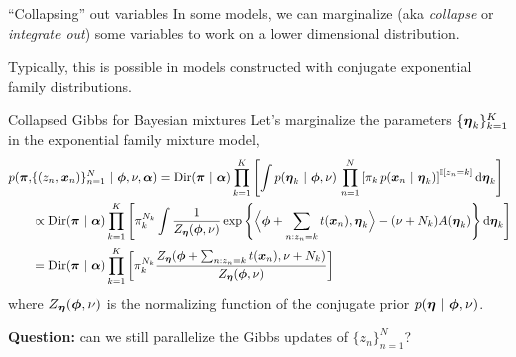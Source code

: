 \documentclass[aspectratio=169]{beamer}
\begin{document}
\begin{frame}{``Collapsing'' out variables}
In some models, we can marginalize (aka \textit{collapse} or \textit{integrate out}) some variables to work on a lower dimensional distribution. 

Typically, this is possible in models constructed with conjugate exponential family distributions.
    
\end{frame}

\begin{frame}{Collapsed Gibbs for Bayesian mixtures}
    Let's marginalize the parameters $\{\boldsymbol{\eta}_k\}_{k=1}^K$ in the exponential family mixture model,
    \begin{align}
        p(\boldsymbol{\pi}, &\{(z_n, \boldsymbol{x}_n)\}_{n=1}^N ~\vert~ \boldsymbol{\phi}, \nu, \boldsymbol{\alpha}) 
        =
        \mathrm{Dir}(\boldsymbol{\pi} ~\vert~ \boldsymbol{\alpha}) \prod_{k=1}^K \left[ \int p(\boldsymbol{\eta}_k ~\vert~ \boldsymbol{\phi}, \nu) \, \prod_{n=1}^N \left[ \pi_k \, p(\boldsymbol{x}_n ~\vert~ \boldsymbol{\eta}_k) \right]^{\mathbb{I}[z_n = k]} \mathop{}\!\mathrm{d} \boldsymbol{\eta}_k \right] \\
        &\propto
        \mathrm{Dir}(\boldsymbol{\pi} ~\vert~ \boldsymbol{\alpha}) \prod_{k=1}^K \left[ \pi_k^{N_k} \int \frac{1}{Z_{\boldsymbol{\eta}}(\boldsymbol{\phi}, \nu)} \exp \left\{\Big\langle \boldsymbol{\phi} + \sum_{n: z_n=k} t(\boldsymbol{x}_n), \boldsymbol{\eta}_k \Big\rangle - (\nu + N_k) A(\boldsymbol{\eta}_k) \right\}  \mathop{}\!\mathrm{d} \boldsymbol{\eta}_k \right] \\
        &=
        \mathrm{Dir}(\boldsymbol{\pi} ~\vert~ \boldsymbol{\alpha}) \prod_{k=1}^K \left[ \pi_k^{N_k} \frac{Z_{\boldsymbol{\eta}}(\boldsymbol{\phi} + \sum_{n: z_n=k} t(\boldsymbol{x}_n), \nu + N_k)}{Z_{\boldsymbol{\eta}}(\boldsymbol{\phi}, \nu)} \right]
    \end{align}
    where $Z_{\boldsymbol{\eta}}(\boldsymbol{\phi}, \nu)$ is the normalizing function of the conjugate prior $p(\boldsymbol{\eta} ~\vert~ \boldsymbol{\phi}, \nu)$.
    
    \textbf{Question: } can we still parallelize the Gibbs updates of $\{z_n\}_{n=1}^N$?
\end{frame}
\end{document}
